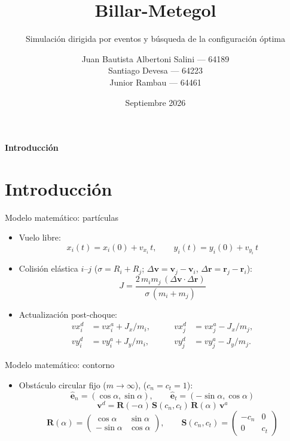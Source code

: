 \documentclass[aspectratio=169]{beamer}
\title{Billar-Metegol}
\subtitle{Simulación dirigida por eventos y búsqueda de la configuración óptima}
\author{\texorpdfstring{%
  Juan Bautista Albertoni Salini --- 64189\\[0.25em]
  Santiago Devesa --- 64223\\[0.25em]
  Junior Rambau --- 64461%
}{Juan Bautista Albertoni Salini 64189; Santiago Devesa 64223; Junior Rambau 64461}}
\institute{(72.25) Simulación de Sistemas --- ITBA}
\date{Septiembre 2026}
\newcommand{\seccion}[1]{%
  \begin{frame}
    \vfill
    \begin{center}{\Huge\bfseries #1}\end{center}
    \vfill
  \end{frame}
}
\begin{document}
\begin{frame}
  \titlepage
\end{frame}

\seccion{Introducción}

\section{Introducción}

\begin{frame}{Modelo matemático: partículas}
  \small
  \setlength{\abovedisplayskip}{3pt}
  \setlength{\belowdisplayskip}{3pt}
  \setlength{\abovedisplayshortskip}{3pt}
  \setlength{\belowdisplayshortskip}{3pt}
  \begin{itemize}
    \setlength{\itemsep}{1em}
    \item Vuelo libre:
      \[
        x_i(t) = x_i(0) + v_{x_i}\,t, \qquad
        y_i(t) = y_i(0) + v_{y_i}\,t
      \]
    \item Colisión elástica $i$--$j$
      ($\sigma = R_i + R_j$;
      $\Delta\mathbf{v} = \mathbf{v}_j - \mathbf{v}_i$,
      $\Delta\mathbf{r} = \mathbf{r}_j - \mathbf{r}_i$):
      \smallskip
      \[
        J = \frac{2\,m_i m_j\,
            (\Delta\mathbf{v} \cdot \Delta\mathbf{r})}
            {\sigma\,(m_i + m_j)}
      \]
    \item Actualización post-choque:
      \begin{align*}
        vx_i^{d} &= vx_i^{a} + J_x/m_i, \qquad &
        vx_j^{d} &= vx_j^{a} - J_x/m_j, \\
        vy_i^{d} &= vy_i^{a} + J_y/m_i, \qquad &
        vy_j^{d} &= vy_j^{a} - J_y/m_j.
      \end{align*}
  \end{itemize}
\end{frame}

\begin{frame}{Modelo matemático: contorno}
  \small
  \setlength{\abovedisplayskip}{3pt}
  \setlength{\belowdisplayskip}{3pt}
  \setlength{\abovedisplayshortskip}{3pt}
  \setlength{\belowdisplayshortskip}{3pt}
  \begin{itemize}
    \setlength{\itemsep}{1.2em}
    \item Obstáculo circular fijo ($m \to \infty$),
      ($c_n = c_t = 1$):
      \smallskip
      \[
        \mathbf{\hat{e}}_n = (\cos\alpha, \sin\alpha), \qquad
        \mathbf{\hat{e}}_t = (-\sin\alpha, \cos\alpha)
      \]
      \medskip
      \[
        \mathbf{v}^d = \mathbf{R}(-\alpha)\, \mathbf{S}(c_n, c_t)\,
            \mathbf{R}(\alpha)\, \mathbf{v}^a
      \]
      \medskip
      \[
        \mathbf{R}(\alpha)
          = \begin{pmatrix}
              \cos\alpha & \sin\alpha \\
              -\sin\alpha & \cos\alpha
            \end{pmatrix}, \qquad
        \mathbf{S}(c_n, c_t)
          = \begin{pmatrix} -c_n & 0 \\ 0 & c_t \end{pmatrix}
      \]
  \end{itemize}
\end{frame}
\end{document}
